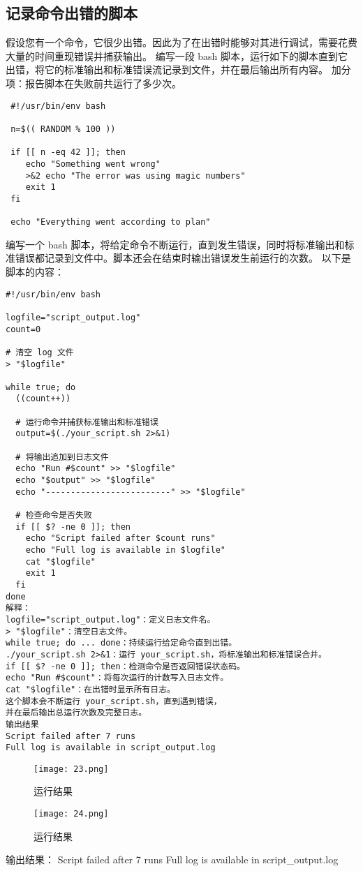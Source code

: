\documentclass[a4paper, 12pt]{article}
\begin{document}
\subsection{记录命令出错的脚本}  
假设您有一个命令，它很少出错。因此为了在出错时能够对其进行调试，需要花费大量的时间重现错误并捕获输出。 编写一段 bash 脚本，运行如下的脚本直到它出错，将它的标准输出和标准错误流记录到文件，并在最后输出所有内容。 加分项：报告脚本在失败前共运行了多少次。
\begin{lstlisting}
 #!/usr/bin/env bash

 n=$(( RANDOM % 100 ))

 if [[ n -eq 42 ]]; then
    echo "Something went wrong"
    >&2 echo "The error was using magic numbers"
    exit 1
 fi

 echo "Everything went according to plan"
\end{lstlisting}
 编写一个 bash 脚本，将给定命令不断运行，直到发生错误，同时将标准输出和标准错误都记录到文件中。脚本还会在结束时输出错误发生前运行的次数。
 以下是脚本的内容：
\begin{lstlisting}
#!/usr/bin/env bash

logfile="script_output.log"
count=0

# 清空 log 文件
> "$logfile"

while true; do
  ((count++))
  
  # 运行命令并捕获标准输出和标准错误
  output=$(./your_script.sh 2>&1)
  
  # 将输出追加到日志文件
  echo "Run #$count" >> "$logfile"
  echo "$output" >> "$logfile"
  echo "-------------------------" >> "$logfile"
  
  # 检查命令是否失败
  if [[ $? -ne 0 ]]; then
    echo "Script failed after $count runs"
    echo "Full log is available in $logfile"
    cat "$logfile"
    exit 1
  fi
done
解释：
logfile="script_output.log"：定义日志文件名。
> "$logfile"：清空日志文件。
while true; do ... done：持续运行给定命令直到出错。
./your_script.sh 2>&1：运行 your_script.sh，将标准输出和标准错误合并。
if [[ $? -ne 0 ]]; then：检测命令是否返回错误状态码。
echo "Run #$count"：将每次运行的计数写入日志文件。
cat "$logfile"：在出错时显示所有日志。
这个脚本会不断运行 your_script.sh，直到遇到错误，
并在最后输出总运行次数及完整日志。
输出结果
Script failed after 7 runs
Full log is available in script_output.log
\end{lstlisting}

\begin{figure}[H]
  \centering
    \texttt{[image: 23.png]}
  \caption{运行结果}
   \end{figure}
\begin{figure}[H]
  \centering
    \texttt{[image: 24.png]}
  \caption{运行结果}
   \end{figure}
   输出结果：
Script failed after 7 runs
Full log is available in script\_output.log
\end{document}

